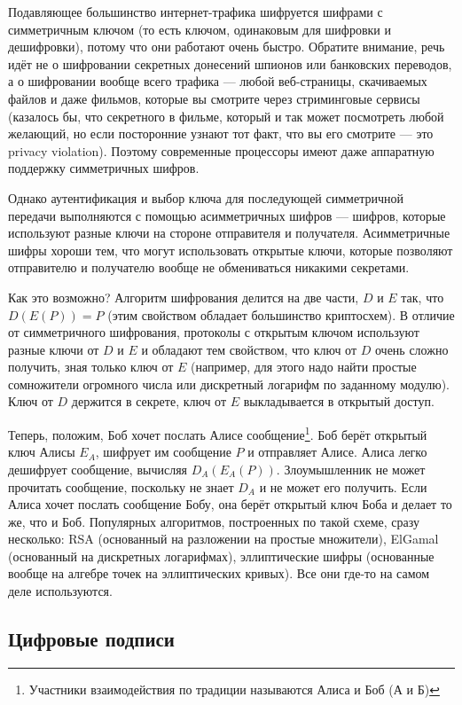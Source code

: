 \documentclass[a5paper]{article}
\begin{document}
Подавляющее большинство интернет-трафика шифруется шифрами с симметричным ключом (то есть ключом, одинаковым для шифровки и дешифровки), потому что они работают очень быстро. Обратите внимание, речь идёт не о шифровании секретных донесений шпионов или банковских переводов, а о шифровании вообще всего трафика --- любой веб-страницы, скачиваемых файлов и даже фильмов, которые вы смотрите через стриминговые сервисы (казалось бы, что секретного в фильме, который и так может посмотреть любой желающий, но если посторонние узнают тот факт, что вы его смотрите --- это privacy violation). Поэтому современные процессоры имеют даже аппаратную поддержку симметричных шифров. 

Однако аутентификация и выбор ключа для последующей симметричной передачи выполняются с помощью асимметричных шифров --- шифров, которые используют разные ключи на стороне отправителя и получателя. Асимметричные шифры хороши тем, что могут использовать открытые ключи, которые позволяют отправителю и получателю вообще не обмениваться никакими секретами. 

Как это возможно? Алгоритм шифрования делится на две части, $D$ и $E$ так, что $D(E(P)) = P$ (этим свойством обладает большинство криптосхем). В отличие от симметричного шифрования, протоколы с открытым ключом используют разные ключи от $D$ и $E$ и обладают тем свойством, что ключ от $D$ очень сложно получить, зная только ключ от $E$ (например, для этого надо найти простые сомножители огромного числа или дискретный логарифм по заданному модулю). Ключ от $D$ держится в секрете, ключ от $E$ выкладывается в открытый доступ.

Теперь, положим, Боб хочет послать Алисе сообщение\footnote{Участники взаимодействия по традиции называются Алиса и Боб (А и Б)}. Боб берёт открытый ключ Алисы $E_A$, шифрует им сообщение $P$ и отправляет Алисе. Алиса легко дешифрует сообщение, вычисляя $D_A(E_A(P))$. Злоумышленник не может прочитать сообщение, поскольку не знает $D_A$ и не может его получить. Если Алиса хочет послать сообщение Бобу, она берёт открытый ключ Боба и делает то же, что и Боб. Популярных алгоритмов, построенных по такой схеме, сразу несколько: RSA (основанный на разложении на простые множители), ElGamal (основанный на дискретных логарифмах), эллиптические шифры (основанные вообще на алгебре точек на эллиптических кривых). Все они где-то на самом деле используются.

\subsection{Цифровые подписи}
\end{document}
